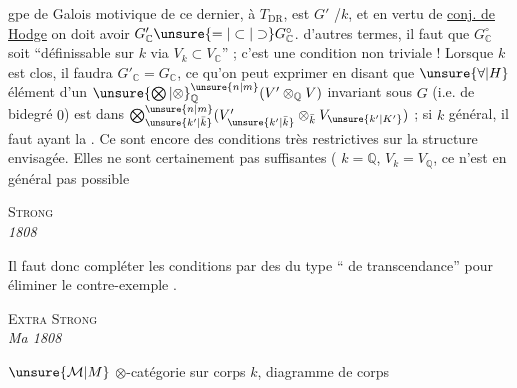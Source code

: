  gpe de Galois motivique de ce dernier,  à $T_{\mathrm{DR}}$, est    $G'$ /$k$,  et en vertu de \uline{conj. de Hodge} on doit avoir $G'_{\mathbb C}\unsure{=|\subset|\supset}G^\circ_{\mathbb C}$.   d'autres termes, il faut que $G^\circ_{\mathbb C}$ soit ``définissable sur $k$ via $V_k\subset V_{\mathbb C}$'' ; c'est une condition   non triviale ! Lorsque $k$ est  clos, il faudra  $G'_{\mathbb C}=G_{\mathbb C}$, ce qu'on peut exprimer en disant que $\unsure{\forall|H}$  élément d'un ${\unsure{\bigotimes|\otimes}}_{\mathbb Q}^{\unsure{n|m}}(V'\otimes_{\mathbb Q}V)$ invariant sous $G$ (i.e. de bidegré $0$) est  dans $\bigotimes_{\unsure{k'|\bar k}}^{\unsure{n|m}}(V'_{\unsure{k'|\bar k}}\otimes_{\bar k}V_{\unsure{k'|K'}})$\unsure{!} ; si $k$ général, il faut   ayant la  . Ce sont encore des conditions très restrictives sur la structure envisagée. Elles ne sont certainement pas suffisantes ( $k=\mathbb Q$, $V_k=V_{\mathbb Q}$, ce n'est en général pas possible
{\centering \textsc{Strong}\\
\textit{ 1808}\par}
Il faut donc compléter les conditions   par des   du type `` de transcendance'' pour éliminer le contre-exemple .

{\centering \textsc{Extra Strong}\\
\textit{Ma 1808}\par}
$\unsure{\mathcal M|M}$ $\otimes$-catégorie sur corps $k$,
diagramme de corps

